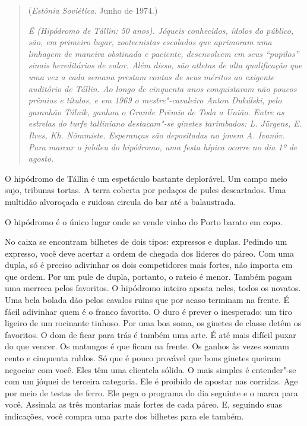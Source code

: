 \begin{quotation}
\begin{flushright}
(\emph{Estônia Soviética}. Junho de 1974.)
\end{flushright}
\vspace{4pt}
\noindent\emph{Ê (Hipódromo de Tállin: 50 anos). Jóqueis
conhecidos, ídolos do público, são, em primeiro lugar, zootecnistas
escolados que aprimoram uma linhagem de maneira obstinada e paciente,
desenvolvem em seus ``pupilos'' sinais hereditários de valor. Além
disso, são atletas de alta qualificação que uma vez a cada semana
prestam contas de seus méritos ao exigente auditório de Tállin. Ao longo
de cinquenta anos conquistaram não poucos prêmios e títulos, e em 1969 o
mestre"-cavaleiro Anton Dukálski, pelo garanhão Tálnik, ganhou o Grande
Prêmio de Toda a União. Entre as estrelas do turfe talliniano
destacam"-se ginetes tarimbados: L. Jürgens, E. Ilves, Kh. Nõmmiste.
Esperanças são depositadas no jovem A. Ivanóv.\\
Para marcar o jubileu do hipódromo, uma festa hípica ocorre no dia 1º de agosto.}
\end{quotation}

O hipódromo de Tállin é um espetáculo bastante deplorável. Um campo meio
sujo, tribunas tortas. A terra coberta por pedaços de pules descartados.
Uma multidão alvoroçada e ruidosa circula do bar até a balaustrada.

O hipódromo é o único lugar onde se vende vinho do Porto barato em copo.

No caixa se encontram bilhetes de dois tipos: expressos e duplas.
Pedindo um expresso, você deve acertar a ordem de chegada dos líderes do
páreo. Com uma dupla, só é preciso adivinhar os dois competidores mais
fortes, não importa em que ordem. Por um pule de dupla, portanto, o
rateio é menor. Também pagam uma merreca pelos favoritos. O hipódromo
inteiro aposta neles, todos os novatos. Uma bela bolada dão pelos
cavalos ruins que por acaso terminam na frente. É fácil adivinhar quem é
o franco favorito. O duro é prever o inesperado: um tiro ligeiro de um
rocinante tinhoso. Por uma boa soma, os ginetes de classe detêm os
favoritos. O dom de ficar para trás é também uma arte. É até mais
difícil puxar do que vencer. Os matungos é que ficam na frente. Os
ganhos às vezes somam cento e cinquenta rublos. Só que é pouco provável
que bons ginetes queiram negociar com você. Eles têm uma clientela
sólida. O mais simples é entender"-se com um jóquei de terceira
categoria. Ele é proibido de apostar nas corridas. Age por meio de
testas de ferro. Ele pega o programa do dia seguinte e o marca para
você. Assinala as três montarias mais fortes de cada páreo. E, seguindo
suas indicações, você compra uma parte dos bilhetes para ele também.


